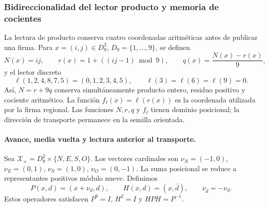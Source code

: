 


\subsubsection{Bidireccionalidad del lector producto y memoria de cocientes}
\label{ii:bim09:seccion}

La lectura de producto conserva cuatro coordenadas aritméticas antes de
publicar una firma. Para $x=(i,j)\in D_9^2$, $D_9=\{1,\ldots,9\}$,
se definen
\[
 N(x)=ij,\qquad r(x)=1+((ij-1)\bmod9),\qquad
 q(x)=\frac{N(x)-r(x)}9,
\]
y el lector discreto
\[
 \ell(1,2,4,8,7,5)=(0,1,2,3,4,5),\qquad
 \ell(3)=\ell(6)=\ell(9)=0.
\]
Así, $N=r+9q$ conserva simultáneamente producto entero, residuo positivo
y cociente aritmético. La función $f_\ell(x)=\ell(r(x))$ es la
coordenada utilizada por la firma regional. Las funciones $N,r,q$ y
$f_\ell$ tienen dominio posicional; la dirección de transporte permanece
en la semilla orientada.

\paragraph{Avance, media vuelta y lectura anterior al transporte.}

Sea $\mathscr X_\times=D_9^2\times\{N,E,S,O\}$. Los vectores cardinales
son $\nu_N=(-1,0)$, $\nu_E=(0,1)$, $\nu_S=(1,0)$,
$\nu_O=(0,-1)$. La suma posicional se reduce a representantes positivos
módulo nueve. Definimos
\[
 P(x,d)=(x+\nu_d,d),\qquad H(x,d)=(x,\bar d),
 \qquad \nu_{\bar d}=-\nu_d.
\]
Estos operadores satisfacen $P^9=I$, $H^2=I$ y $HPH=P^{-1}$.

